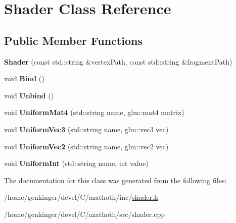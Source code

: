 \hypertarget{classShader}{}\section{Shader Class Reference}
\label{classShader}
\subsection*{Public Member Functions}
\begin{DoxyCompactItemize}
\item 
\mbox{\label{classShader_ad80a9756b7d9a62adea45fcd82a06f4c}} 
{\bfseries Shader} (const std\+::string \&vertex\+Path, const std\+::string \&fragment\+Path)
\item 
\mbox{\label{classShader_a8b5c8c4788d011a65d158ef8428d1ece}} 
void {\bfseries Bind} ()
\item 
\mbox{\label{classShader_aa53965ba78cf36b664e1f53d337b1b0b}} 
void {\bfseries Unbind} ()
\item 
\mbox{\label{classShader_a015be391017a8e440eef3e568b0bb685}} 
void {\bfseries Uniform\+Mat4} (std\+::string name, glm\+::mat4 matrix)
\item 
\mbox{\label{classShader_ada1bc24f3c1b7f1b418fddabcf359ba1}} 
void {\bfseries Uniform\+Vec3} (std\+::string name, glm\+::vec3 vec)
\item 
\mbox{\label{classShader_a222c5c1b6e023caa3239cf834f9c203b}} 
void {\bfseries Uniform\+Vec2} (std\+::string name, glm\+::vec2 vec)
\item 
\mbox{\label{classShader_a72400369e1b397ee49823ca15344c1d4}} 
void {\bfseries Uniform\+Int} (std\+::string name, int value)
\end{DoxyCompactItemize}


The documentation for this class was generated from the following files\+:\begin{DoxyCompactItemize}
\item 
/home/genkinger/devel/\+C/azathoth/inc/\mbox{\hyperlink{shader_8h}{shader.\+h}}\item 
/home/genkinger/devel/\+C/azathoth/src/shader.\+cpp\end{DoxyCompactItemize}
